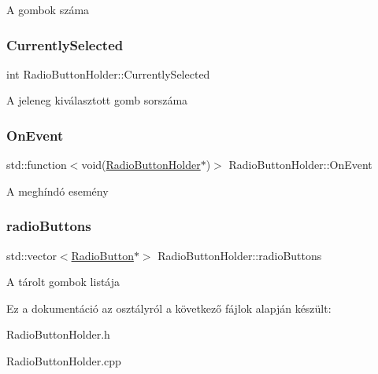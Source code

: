 A gombok száma \mbox{\label{class_radio_button_holder_a72c73d2f99d20384f334903cec24040e}} 
\subsubsection{\texorpdfstring{Currently\+Selected}{CurrentlySelected}}
{\footnotesize\ttfamily int Radio\+Button\+Holder\+::\+Currently\+Selected\hspace{0.3cm}{\ttfamily [private]}}

A jeleneg kiválasztott gomb sorszáma \mbox{\label{class_radio_button_holder_ac2ecfd4a57032afaa6455f9b559a00b3}} 
\subsubsection{\texorpdfstring{On\+Event}{OnEvent}}
{\footnotesize\ttfamily std\+::function$<$void(\hyperlink{class_radio_button_holder}{Radio\+Button\+Holder}$\ast$)$>$ Radio\+Button\+Holder\+::\+On\+Event\hspace{0.3cm}{\ttfamily [private]}}

A meghíndó esemény \mbox{\label{class_radio_button_holder_aaed6e22df55ff0174b150c675caff07a}} 
\subsubsection{\texorpdfstring{radio\+Buttons}{radioButtons}}
{\footnotesize\ttfamily std\+::vector$<$\hyperlink{class_radio_button}{Radio\+Button}$\ast$$>$ Radio\+Button\+Holder\+::radio\+Buttons\hspace{0.3cm}{\ttfamily [private]}}

A tárolt gombok listája 

Ez a dokumentáció az osztályról a következő fájlok alapján készült\+:\begin{DoxyCompactItemize}
\item 
Radio\+Button\+Holder.\+h\item 
Radio\+Button\+Holder.\+cpp\end{DoxyCompactItemize}
